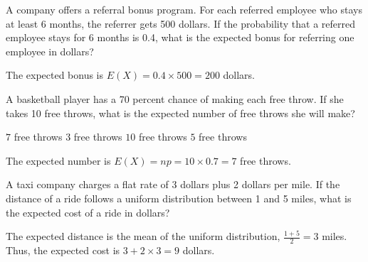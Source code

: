 



\question A company offers a referral bonus program. For each referred employee who stays at least 6 months, the referrer gets 500 dollars. If the probability that a referred employee stays for 6 months is 0.4, what is the expected bonus for referring one employee in dollars?

\begin{oneparchoices}
\end{oneparchoices}

\begin{solution}
The expected bonus is \(E(X) = 0.4 \times 500 = 200\) dollars.
\end{solution}
    




\question A basketball player has a 70 percent chance of making each free throw. If she takes 10 free throws, what is the expected number of free throws she will make?

\begin{oneparchoices}
\correctchoice $7$ free throws
\choice $3$ free throws
\choice $10$ free throws
\choice $5$ free throws
\end{oneparchoices}

\begin{solution}
The expected number is \(E(X) = np = 10 \times 0.7 = 7\) free throws.
\end{solution}
    




\question A taxi company charges a flat rate of 3 dollars plus 2 dollars per mile. If the distance of a ride follows a uniform distribution between 1 and 5 miles, what is the expected cost of a ride in dollars?

\begin{oneparchoices}
\end{oneparchoices}

\begin{solution}
The expected distance is the mean of the uniform distribution, \(\frac{1 + 5}{2} = 3\) miles. Thus, the expected cost is \(3 + 2 \times 3 = 9\) dollars.
\end{solution}
    

